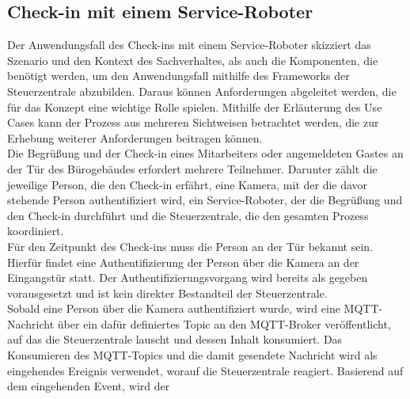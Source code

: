 \subsection{Check-in mit einem Service-Roboter}
\label{subsec:checkin}
    Der Anwendungsfall des Check-ins mit einem Service-Roboter skizziert das Szenario und den Kontext des Sachverhaltes, als 
    auch die Komponenten, die benötigt werden, um den Anwendungsfall mithilfe des Frameworks der Steuerzentrale abzubilden. 
    Daraus können Anforderungen abgeleitet werden, die für das Konzept eine wichtige Rolle spielen. Mithilfe der 
    Erläuterung des Use Cases kann der Prozess aus mehreren Sichtweisen betrachtet werden, die zur Erhebung weiterer 
    Anforderungen beitragen können. 
    \\
    \linebreak
    Die Begrüßung und der Check-in eines Mitarbeiters oder angemeldeten Gastes an der Tür des Bürogebäudes erfordert mehrere Teilnehmer. 
    Darunter zählt die jeweilige Person, die den Check-in erfährt, eine Kamera, mit der die davor stehende Person authentifiziert wird, 
    ein Service-Roboter, der die Begrüßung und den Check-in durchführt und die Steuerzentrale, die den gesamten Prozess koordiniert. 
    \\
    \linebreak
    Für den Zeitpunkt des Check-ins muss die Person an 
    der Tür bekannt sein. Hierfür findet eine Authentifizierung der Person über die Kamera an der Eingangstür statt. Der 
    Authentifizierungsvorgang wird bereits als gegeben vorausgesetzt und ist kein direkter Bestandteil der Steuerzentrale. 
    \\
    Sobald eine Person über die Kamera authentifiziert wurde, wird eine \acs{MQTT}-Nachricht über ein dafür definiertes Topic 
    an den \acs{MQTT}-Broker veröffentlicht, 
    auf das die Steuerzentrale lauscht und dessen Inhalt konsumiert. Das Konsumieren des \acs{MQTT}-Topics und die damit gesendete 
    Nachricht wird als eingehendes Ereignis verwendet, worauf die Steuerzentrale reagiert. Basierend auf dem eingehenden Event, wird der 
